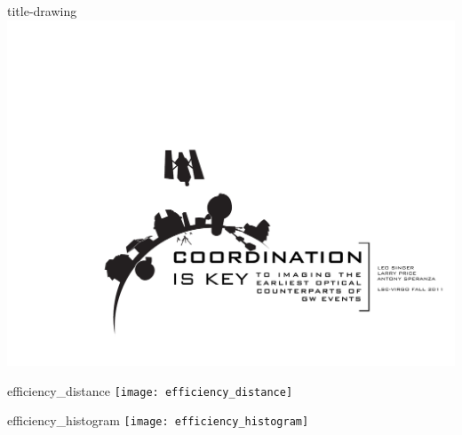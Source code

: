 \documentclass[portrait]{a0poster}
\begin{document}

\begin{staticcontents*}{title-drawing}
\includegraphics[width=\textwidth,clip=true,trim=0cm 5cm 0cm 0cm]{title-drawing.pdf}
\end{staticcontents*}

\begin{staticcontents*}{efficiency_distance}
\texttt{[image: efficiency\_distance]}
\end{staticcontents*}

\begin{staticcontents*}{efficiency_histogram}
\texttt{[image: efficiency\_histogram]}
\end{staticcontents*}
\end{document}
